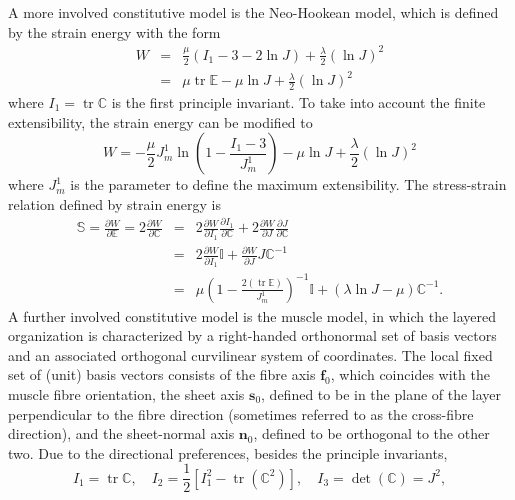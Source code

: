 \documentclass[12pt, a4paper,onecolumn]{article}
\newcommand{\tr}{\mathop{\mathrm{tr}}}
\begin{document}
A more involved constitutive model is the Neo-Hookean model,
which is defined by the strain energy with the form
%
\begin{eqnarray}\label{Neo-Hookean-energy}
W & = & \frac{\mu}{2}(I_1 - 3 - 2 \ln J) + \frac{\lambda}{2}(\ln J)^{2} \nonumber\\
& = & \mu \tr \mathbb{E} - \mu \ln J + \frac{\lambda}{2}(\ln J)^{2}
\end{eqnarray}
%
where $I_1 = \tr \mathbb{C}$ is the first principle invariant.
To take into account the finite extensibility, 
the strain energy can be modified to
%
\begin{equation}\label{Neo-Hookean-energy-finite-extensibility}
W = -\frac{\mu}{2}J^{1}_{m}\ln \left(1 - \frac{I_1 - 3}{J^{1}_{m}}\right)  - \mu\ln J + \frac{\lambda}{2}(\ln J)^{2}
\end{equation}
%
where $J^{1}_{m}$ is the parameter to define the maximum extensibility.
The stress-strain relation defined by strain energy is
%
\begin{eqnarray}\label{stress-strain-energy}
\mathbb{S}  = \frac{\partial W}{\partial \mathbb{E}} = 2\frac{\partial W}{\partial \mathbb{C}}
& =  &2\frac{\partial W}{\partial I_1}\frac{\partial I_1}{\partial \mathbb{C}} 
+ 2\frac{\partial W}{\partial J}\frac{\partial J}{\partial \mathbb{C}} \nonumber\\
& = & 2\frac{\partial W}{\partial I_1} \mathbb{I} + \frac{\partial W}{\partial J} J \mathbb{C}^{-1}   \\
& = & \mu \left(1 - \frac{2(\tr \mathbb{E})}{J^{1}_{m}}\right)^{-1} \mathbb{I} + (\lambda \ln J - \mu) \mathbb{C}^{-1}. \nonumber
\end{eqnarray}
%
A further involved constitutive model is the muscle model, 
in which the layered organization is characterized by a right-handed orthonormal set of
basis vectors and an associated orthogonal curvilinear system of coordinates. 
The local fixed set of (unit) basis vectors consists of the fibre axis  $\mathbf{f}_0$, which coincides
with the muscle fibre orientation, the sheet axis $\mathbf{s}_0$, defined to be in the plane
of the layer perpendicular to the fibre direction (sometimes referred to as the
cross-fibre direction), and the sheet-normal axis $\mathbf{n}_0$, defined to be orthogonal to the other two.
Due to the directional preferences, besides the principle invariants,
%
\begin{equation}\label{principle-invariants}
I_1 = \tr \mathbb{C}, \quad I_2 = \frac{1}{2}\left[I^2_1 - \tr(\mathbb{C}^2)\right], \quad I_3 = \det(\mathbb{C}) = J^2,
\end{equation}
\end{document}
